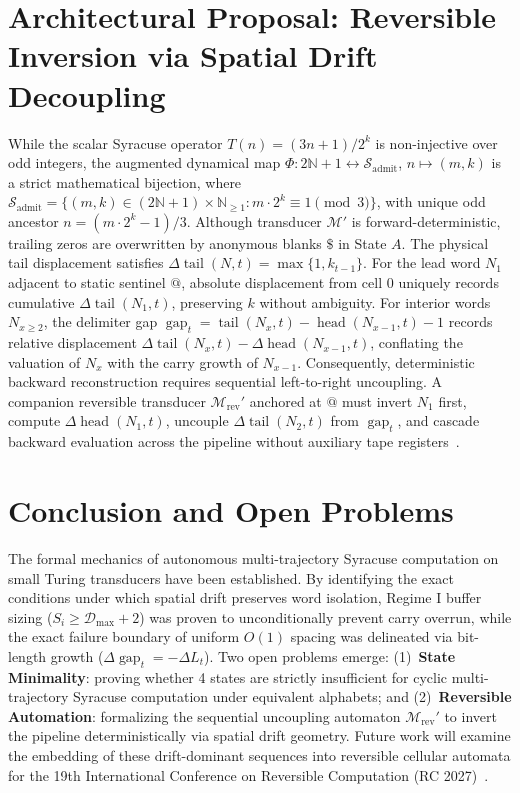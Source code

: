 \documentclass[journal,10pt,twocolumn]{IEEEtran}
\DeclareMathOperator{\tail}{tail}
\DeclareMathOperator{\head}{head}
\DeclareMathOperator{\gap}{gap}
\begin{document}
\section{Architectural Proposal: Reversible Inversion via Spatial Drift Decoupling}
\label{sec:reversible_drift}
While the scalar Syracuse operator $T(n) = (3n+1)/2^k$ is non-injective over odd integers, the augmented dynamical map $\Phi: 2\mathbb{N}+1 \longleftrightarrow \mathcal{S}_{\text{admit}}$, $n \mapsto (m, k)$ is a strict mathematical bijection, where $\mathcal{S}_{\text{admit}} = \{ (m, k) \in (2\mathbb{N}+1) \times \mathbb{N}_{\ge 1} : m \cdot 2^k \equiv 1 \pmod 3 \}$, with unique odd ancestor $n = (m \cdot 2^k - 1)/3$. Although transducer $\mathcal{M}'$ is forward-deterministic, trailing zeros are overwritten by anonymous blanks $\$$ in State $A$. The physical tail displacement satisfies $\Delta \tail(N, t) = \max\{1, k_{t-1}\}$. For the lead word $N_1$ adjacent to static sentinel $@$, absolute displacement from cell 0 uniquely records cumulative $\Delta\tail(N_1, t)$, preserving $k$ without ambiguity. For interior words $N_{x \ge 2}$, the delimiter gap $\gap_t = \tail(N_x, t) - \head(N_{x-1}, t) - 1$ records relative displacement $\Delta\tail(N_x, t) - \Delta\head(N_{x-1}, t)$, conflating the valuation of $N_x$ with the carry growth of $N_{x-1}$. Consequently, deterministic backward reconstruction requires sequential left-to-right uncoupling. A companion reversible transducer $\mathcal{M}_{\text{rev}}'$ anchored at $@$ must invert $N_1$ first, compute $\Delta\head(N_1, t)$, uncouple $\Delta\tail(N_2, t)$ from $\gap_t$, and cascade backward evaluation across the pipeline without auxiliary tape registers~\cite{yokoyama2020,fredkin1982}.

\section{Conclusion and Open Problems}
\label{sec:conclusion}
The formal mechanics of autonomous multi-trajectory Syracuse computation on small Turing transducers have been established. By identifying the exact conditions under which spatial drift preserves word isolation, Regime I buffer sizing ($S_i \ge \mathcal{D}_{\max} + 2$) was proven to unconditionally prevent carry overrun, while the exact failure boundary of uniform $O(1)$ spacing was delineated via bit-length growth ($\Delta\gap_t = -\Delta L_t$).
Two open problems emerge: (1)~\textbf{State Minimality}: proving whether 4 states are strictly insufficient for cyclic multi-trajectory Syracuse computation under equivalent alphabets; and (2)~\textbf{Reversible Automation}: formalizing the sequential uncoupling automaton $\mathcal{M}_{\text{rev}}'$ to invert the pipeline deterministically via spatial drift geometry. Future work will examine the embedding of these drift-dominant sequences into reversible cellular automata for the 19th International Conference on Reversible Computation (RC 2027)~\cite{wolfram2002}.
\end{document}
